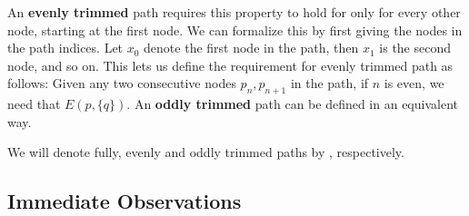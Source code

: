 An \textbf{evenly trimmed} path requires this property to hold for only for every other node, starting at the first node.
We can formalize this by first giving the nodes in the path indices.
Let $x_0$ denote the first node in the path, then $x_1$ is the second node, and so on.
This lets us define the requirement for evenly trimmed path as follows: Given any two consecutive nodes $p_n,p_{n+1}$ in the path, if $n$ is even, we need that $E(p,\{q\})$.
An \textbf{oddly trimmed} path can be defined in an equivalent way.

We will denote fully, evenly and oddly trimmed paths by , respectively.

\subsection{Immediate Observations}
\label{sub:Immediate Observations}

